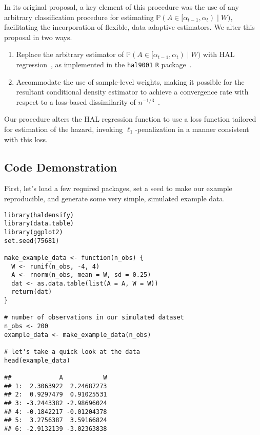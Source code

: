 In its original proposal, a key element of this procedure was the use of any
arbitrary classification procedure for estimating $\mathbb{P}(A \in
[\alpha_{t-1}, \alpha_t) \mid W)$, facilitating the incorporation of flexible,
data adaptive estimators. We alter this proposal in two ways.
\begin{enumerate}
  \item Replace the arbitrary estimator of $\mathbb{P}(A \in [\alpha_{t-1},
      \alpha_t) \mid W)$ with HAL regression~\citep{vdl2015generally,
      benkeser2016highly,vdl2017generally}, as implemented in the
      \texttt{hal9001} \texttt{R} package~\citep{coyle2021hal9001,
      hejazi2020hal9001}.
  \item Accommodate the use of sample-level weights, making it possible for
     the resultant conditional density estimator to achieve a convergence rate
     with respect to a loss-based dissimilarity of
     $n^{-1/3}$~\citep{bibaut2019fast}.
\end{enumerate}

Our procedure alters the HAL regression function to use a loss function tailored
for estimation of the hazard, invoking $\ell_1$-penalization in a manner
consistent with this loss.

\subsection{Code Demonstration}

First, let's load a few required packages, set a seed to make our example
reproducible, and generate some very simple, simulated example data.

\begin{lstlisting}
library(haldensify)
library(data.table)
library(ggplot2)
set.seed(75681)

make_example_data <- function(n_obs) {
  W <- runif(n_obs, -4, 4)
  A <- rnorm(n_obs, mean = W, sd = 0.25)
  dat <- as.data.table(list(A = A, W = W))
  return(dat)
}

# number of observations in our simulated dataset
n_obs <- 200
example_data <- make_example_data(n_obs)

# let's take a quick look at the data
head(example_data)

##             A           W
## 1:  2.3063922  2.24687273
## 2:  0.9297479  0.91025531
## 3: -3.2443382 -2.98696024
## 4: -0.1842217 -0.01204378
## 5:  3.2756387  3.59166824
## 6: -2.9132139 -3.02363838
\end{lstlisting}

